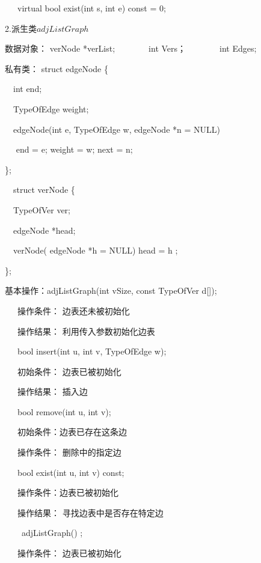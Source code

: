 \documentclass[paper=a4,UTF8,fontsize=11pt]{scrartcl} %
\numberwithin{equation}{section} %
\numberwithin{figure}{section} %
\numberwithin{table}{section} %
\begin{document}
\qquad \qquad \quad \ \ \     virtual bool exist(int s, int e) const = 0;

\vspace{0.2cm}

2.派生类$adjListGraph$

数据对象： verNode *verList;\ \ \ \ \ \ \ \ int Vers；\ \ \ \ \ \ \ \ int Edges;

私有类：   struct edgeNode \{

    \qquad \qquad \ \  int end;

    \qquad \qquad \ \ TypeOfEdge weight;
    
    \qquad \qquad \ \  edgeNode(int e, TypeOfEdge w, edgeNode *n = NULL)

    \qquad \qquad \ \ { end = e; weight = w; next = n;}
    
    \};
    
    \qquad \qquad \ \ struct verNode \{
        
    \qquad \qquad \ \ TypeOfVer ver; 
    
    \qquad \qquad \ \ edgeNode *head;  
    
    \qquad \qquad \ \ verNode( edgeNode *h = NULL)  { head = h ;}
    
    \};
    
基本操作：adjListGraph(int vSize, const TypeOfVer d[]);

\qquad \qquad \quad \ \ \ 操作条件： 边表还未被初始化

\qquad \qquad \quad \ \ \ 操作结果： 利用传入参数初始化边表

\qquad \qquad \quad \ \ \ bool insert(int u, int v, TypeOfEdge w);

\qquad \qquad \quad \ \ \ 初始条件： 边表已被初始化

\qquad \qquad \quad \ \ \ 操作结果： 插入边

\qquad \qquad \quad \ \ \ bool remove(int u, int v);

\qquad \qquad \quad \ \ \ 初始条件：边表已存在这条边

\qquad \qquad \quad \ \ \ 操作条件： 删除中的指定边

\qquad \qquad \quad \ \ \      bool exist(int u, int v) const;

\qquad \qquad \quad \ \ \  操作条件：边表已被初始化 

\qquad \qquad \quad \ \ \ 操作结果： 寻找边表中是否存在特定边

\qquad \qquad \quad \ \ \ ~adjListGraph() ;

\qquad \qquad \quad \ \ \ 操作条件： 边表已被初始化
\end{document}
